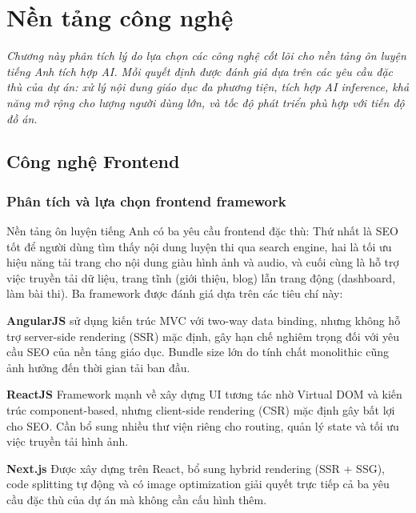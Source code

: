 \chapter{Nền tảng công nghệ}
\textit{Chương này phân tích lý do lựa chọn các công nghệ cốt lõi cho nền tảng ôn luyện tiếng Anh tích hợp AI. Mỗi quyết định được đánh giá dựa trên các yêu cầu đặc thù của dự án: xử lý nội dung giáo dục đa phương tiện, tích hợp AI inference, khả năng mở rộng cho lượng người dùng lớn, và tốc độ phát triển phù hợp với tiến độ đồ án.}

\section{Công nghệ Frontend}

\subsection{Phân tích và lựa chọn frontend framework}

Nền tảng ôn luyện tiếng Anh có ba yêu cầu frontend đặc thù: Thứ nhất là SEO tốt để người dùng tìm thấy nội dung luyện thi qua search engine, hai là tối ưu hiệu năng tải trang cho nội dung giàu hình ảnh và audio, và cuối cùng là hỗ trợ việc truyền tải dữ liệu, trang tĩnh (giới thiệu, blog) lẫn trang động (dashboard, làm bài thi). Ba framework được đánh giá dựa trên các tiêu chí này:

\textbf{AngularJS} sử dụng kiến trúc MVC với two-way data binding, nhưng không hỗ trợ server-side rendering (SSR) mặc định, gây hạn chế nghiêm trọng đối với yêu cầu SEO của nền tảng giáo dục. Bundle size lớn do tính chất monolithic cũng ảnh hưởng đến thời gian tải ban đầu. \cite{angularjs}

\textbf{ReactJS} Framework mạnh về xây dựng UI tương tác nhờ Virtual DOM và kiến trúc component-based, nhưng client-side rendering (CSR) mặc định gây bất lợi cho SEO. Cần bổ sung nhiều thư viện riêng cho routing, quản lý state và tối ưu việc truyền tải hình ảnh. \cite{angular_react}

\textbf{Next.js} Được xây dựng trên React, bổ sung hybrid rendering (SSR + SSG), code splitting tự động và có image optimization giải quyết trực tiếp cả ba yêu cầu đặc thù của dự án mà không cần cấu hình thêm. \cite{next_react_angular}

